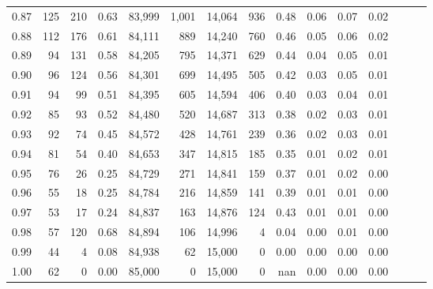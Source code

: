 \begin{tabular}{rrrrrrrrrrrrrrr}
0.87 &    125 &  210 &  0.63 &  83,999 &   1,001 &  14,064 &     936 &  0.48 &  0.06 &  0.07 &      0.02 \\
0.88 &    112 &  176 &  0.61 &  84,111 &     889 &  14,240 &     760 &  0.46 &  0.05 &  0.06 &      0.02 \\
0.89 &     94 &  131 &  0.58 &  84,205 &     795 &  14,371 &     629 &  0.44 &  0.04 &  0.05 &      0.01 \\
0.90 &     96 &  124 &  0.56 &  84,301 &     699 &  14,495 &     505 &  0.42 &  0.03 &  0.05 &      0.01 \\
0.91 &     94 &   99 &  0.51 &  84,395 &     605 &  14,594 &     406 &  0.40 &  0.03 &  0.04 &      0.01 \\
0.92 &     85 &   93 &  0.52 &  84,480 &     520 &  14,687 &     313 &  0.38 &  0.02 &  0.03 &      0.01 \\
0.93 &     92 &   74 &  0.45 &  84,572 &     428 &  14,761 &     239 &  0.36 &  0.02 &  0.03 &      0.01 \\
0.94 &     81 &   54 &  0.40 &  84,653 &     347 &  14,815 &     185 &  0.35 &  0.01 &  0.02 &      0.01 \\
0.95 &     76 &   26 &  0.25 &  84,729 &     271 &  14,841 &     159 &  0.37 &  0.01 &  0.02 &      0.00 \\
0.96 &     55 &   18 &  0.25 &  84,784 &     216 &  14,859 &     141 &  0.39 &  0.01 &  0.01 &      0.00 \\
0.97 &     53 &   17 &  0.24 &  84,837 &     163 &  14,876 &     124 &  0.43 &  0.01 &  0.01 &      0.00 \\
0.98 &     57 &  120 &  0.68 &  84,894 &     106 &  14,996 &       4 &  0.04 &  0.00 &  0.01 &      0.00 \\
0.99 &     44 &    4 &  0.08 &  84,938 &      62 &  15,000 &       0 &  0.00 &  0.00 &  0.00 &      0.00 \\
1.00 &     62 &    0 &  0.00 &  85,000 &       0 &  15,000 &       0 &   nan &  0.00 &  0.00 &      0.00 \\
\bottomrule
\end{tabular}
